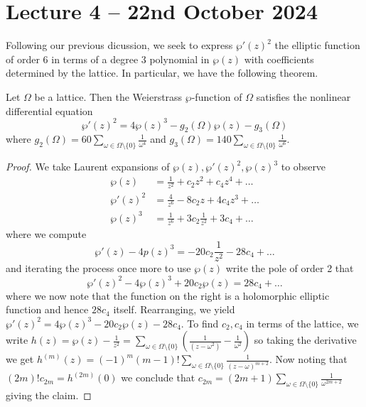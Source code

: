 \section{Lecture 4 -- 22nd October 2024}\label{sec: lecture 4}
Following our previous dicussion, we seek to express $\wp'(z)^{2}$ the elliptic function of order 6 in terms of a degree 3 polynomial in $\wp(z)$ with coefficients determined by the lattice. In particular, we have the following theorem. 
\begin{theorem}\label{thm: Weierstrass differential equation}
    Let $\Omega$ be a lattice. Then the Weierstrass $\wp$-function of $\Omega$ satisfies the nonlinear differential equation
    \begin{equation}\label{eqn: Weierstrass differential equation}
        \wp'(z)^{2}=4\wp(z)^{3}-g_{2}(\Omega)\wp(z)-g_{3}(\Omega)
    \end{equation}
    where $g_{2}(\Omega)=60\sum_{\omega\in\Omega\setminus\{0\}}\frac{1}{\omega^{4}}$ and $g_{3}(\Omega)=140\sum_{\omega\in\Omega\setminus\{0\}}\frac{1}{\omega^{6}}$.
\end{theorem}
\begin{proof}
    We take Laurent expansions of $\wp(z),\wp'(z)^{2},\wp(z)^{3}$ to observe 
    \begin{align*}
        \wp(z) &= \frac{1}{z^{2}}+c_{2}z^{2}+c_{4}z^{4}+\dots \\
        \wp'(z)^{2} &= \frac{4}{z^{6}}-8c_{2}z+4c_{4}z^{3}+\dots \\
        \wp(z)^{3} &= \frac{1}{z^{6}} +3c_{2}\frac{1}{z^{2}} + 3c_{4}+\dots
    \end{align*}
    where we compute 
    $$\wp'(z)-4p(z)^{3}=-20c_{2}\frac{1}{z^{2}}-28c_{4}+\dots$$
    and iterating the process once more to use $\wp(z)$ write the pole of order 2 that 
    $$\wp'(z)^{2}-4\wp(z)^{3}+20c_{2}\wp(z)=28c_{4}+\dots$$
    where we now note that the function on the right is a holomorphic elliptic function and hence $28c_{4}$ itself. Rearranging, we yield $\wp'(z)^{2}=4\wp(z)^{3}-20c_{2}\wp(z)-28c_{4}$. To find $c_{2},c_{4}$ in terms of the lattice, we write $h(z)=\wp(z)-\frac{1}{z^{2}}=\sum_{\omega\in\Omega\setminus\{0\}}\left(\frac{1}{(z-\omega^{2})}-\frac{1}{\omega^{2}}\right)$ so taking the derivative we get $h^{(m)}(z)=(-1)^{m}(m-1)!\sum_{\omega\in\Omega\setminus\{0\}}\frac{1}{(z-\omega)^{m+2}}$. Now noting that $(2m)!c_{2m}=h^{(2m)}(0)$ we conclude that $c_{2m}=(2m+1)\sum_{\omega\in\Omega\setminus\{0\}}\frac{1}{\omega^{2m+2}}$ giving the claim. 
\end{proof}

